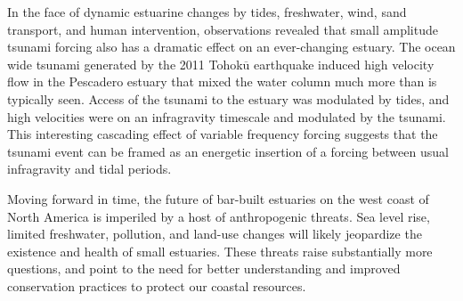 In the face of dynamic estuarine changes by tides, freshwater, wind, sand transport, and human intervention, observations revealed that small amplitude tsunami forcing also has a dramatic effect on an ever-changing estuary. The ocean wide tsunami generated by the 2011 Tohok$\overline{\mathrm{u}}$ earthquake induced high velocity flow in the Pescadero estuary that mixed the water column much more than is typically seen. Access of the tsunami to the estuary was modulated by tides, and high velocities were on an infragravity timescale and modulated by the tsunami. This interesting cascading effect of variable frequency forcing suggests that the tsunami event can be framed as an energetic insertion of a forcing between usual infragravity and tidal periods.

Moving forward in time, the future of bar-built estuaries on the west coast of North America is imperiled by a host of anthropogenic threats. Sea level rise, limited freshwater, pollution, and land-use changes will likely jeopardize the existence and health of small estuaries. These threats raise substantially more questions, and point to the need for better understanding and improved conservation practices to protect our coastal resources. 
